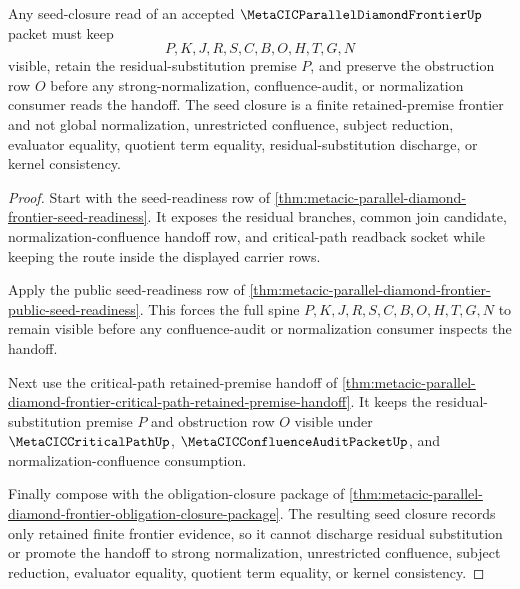 \begin{theorem}
\label{thm:metacic-parallel-diamond-frontier-seed-closure}
Any seed-closure read of an accepted $\MetaCICParallelDiamondFrontierUp$ packet must keep
$$
P,K,J,R,S,C,B,O,H,T,G,N
$$
visible, retain the residual-substitution premise $P$, and preserve the obstruction row $O$ before any strong-normalization, confluence-audit, or normalization consumer reads the handoff. The seed closure is a finite retained-premise frontier and not global normalization, unrestricted confluence, subject reduction, evaluator equality, quotient term equality, residual-substitution discharge, or kernel consistency.
\end{theorem}
\begin{proof}
Start with the seed-readiness row of \autoref{thm:metacic-parallel-diamond-frontier-seed-readiness}. It exposes the residual branches, common join candidate, normalization-confluence handoff row, and critical-path readback socket while keeping the route inside the displayed carrier rows.

Apply the public seed-readiness row of \autoref{thm:metacic-parallel-diamond-frontier-public-seed-readiness}. This forces the full spine $P,K,J,R,S,C,B,O,H,T,G,N$ to remain visible before any confluence-audit or normalization consumer inspects the handoff.

Next use the critical-path retained-premise handoff of \autoref{thm:metacic-parallel-diamond-frontier-critical-path-retained-premise-handoff}. It keeps the residual-substitution premise $P$ and obstruction row $O$ visible under $\MetaCICCriticalPathUp$, $\MetaCICConfluenceAuditPacketUp$, and normalization-confluence consumption.

Finally compose with the obligation-closure package of \autoref{thm:metacic-parallel-diamond-frontier-obligation-closure-package}. The resulting seed closure records only retained finite frontier evidence, so it cannot discharge residual substitution or promote the handoff to strong normalization, unrestricted confluence, subject reduction, evaluator equality, quotient term equality, or kernel consistency.
\end{proof}
